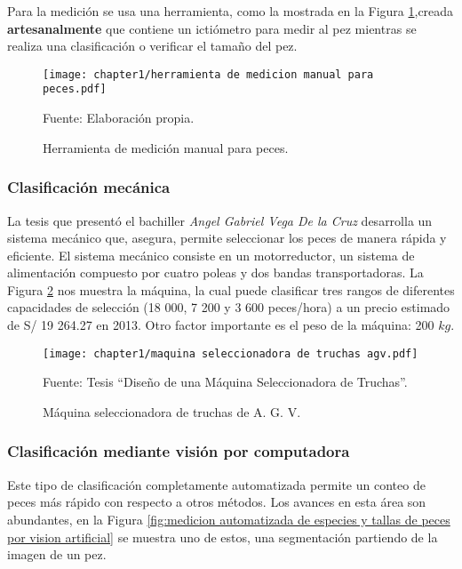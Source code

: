 Para la medición se usa una herramienta, como la mostrada en la Figura \ref{fig:herramienta de medicion manual para peces},creada \textbf{artesanalmente} que contiene un ictiómetro para medir al pez mientras se realiza una clasificación o verificar el tamaño del pez. 

\begin{figure}[H]
	\centering
	\texttt{[image: chapter1/herramienta de medicion manual para peces.pdf]}
	\caption{Herramienta de medición manual para peces.}
	Fuente: Elaboración propia.
	\label{fig:herramienta de medicion manual para peces}
\end{figure}

\subsubsection{Clasificación mecánica}

La tesis que presentó el bachiller \textit{Angel Gabriel Vega De la Cruz} desarrolla un sistema mecánico que, asegura, permite seleccionar los peces de manera rápida y eficiente. El sistema mecánico consiste en un motorreductor, un sistema de alimentación compuesto por cuatro poleas y dos bandas transportadoras. La Figura \ref{fig:maquina seleccionadora de truchas agv} nos muestra la máquina, la cual puede clasificar tres rangos de  diferentes capacidades de selección (18 000, 7 200 y 3 600 peces/hora) a un precio estimado de S/ 19 264.27 en 2013. Otro factor importante es el peso de la máquina: 200 $ kg $.\cite[p.~2,105]{Vega2013}

\begin{figure}[H]
	\centering
	\texttt{[image: chapter1/maquina seleccionadora de truchas agv.pdf]}
	\caption{Máquina seleccionadora de truchas de A. G. V.}
	Fuente: Tesis “Diseño de una Máquina Seleccionadora de Truchas”.
	\label{fig:maquina seleccionadora de truchas agv}
\end{figure}

\subsubsection{Clasificación mediante visión por computadora}

Este tipo de clasificación completamente automatizada permite un conteo de peces más rápido con respecto a otros métodos.\cite[p.~2-3]{Niu2018} Los avances en esta área son abundantes, en la Figura \ref{fig:medicion automatizada de especies y tallas de peces por vision artificial} se muestra uno de estos, una segmentación partiendo de la imagen de un pez.


